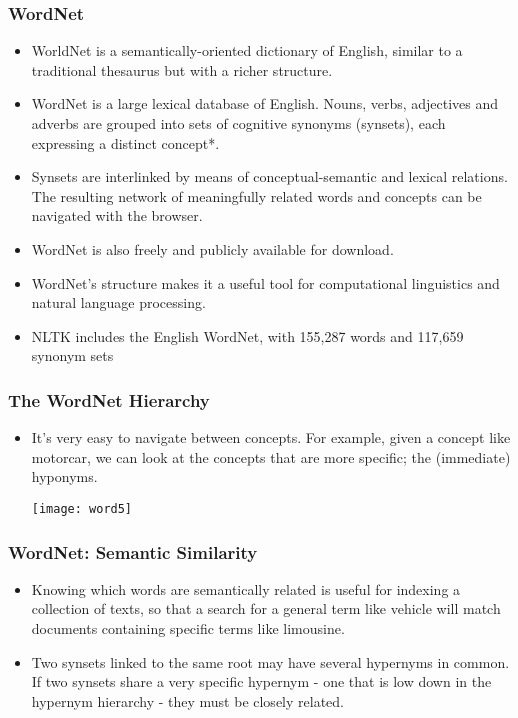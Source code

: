 \begin{frame}[fragile]\frametitle{WordNet}
\begin{itemize}
\item WorldNet is a semantically-oriented dictionary of English, similar to a traditional thesaurus but with a richer structure.
\item WordNet is a large lexical database of English. Nouns, verbs, adjectives and adverbs are grouped into sets of cognitive synonyms (synsets), each expressing a distinct concept*. 
\item Synsets are interlinked by means of conceptual-semantic and lexical relations. The resulting network of meaningfully related words and concepts can be navigated with the browser. 
\item WordNet is also freely and publicly available for download. 
\item WordNet's structure makes it a useful tool for computational linguistics and natural language processing. 
\item NLTK includes the English WordNet, with 155,287 words and 117,659 synonym sets
\end{itemize}
\end{frame}


\begin{frame}[fragile]
\frametitle{The WordNet Hierarchy}
\begin{itemize}
\item It's very easy to navigate between concepts. For example, given a concept like motorcar, we can look at the concepts that are more specific; the (immediate) hyponyms.

\begin{center}
\texttt{[image: word5]}
\end{center}
\end{itemize}
\end{frame}

\begin{frame}[fragile]
\frametitle{WordNet: Semantic Similarity}
\begin{itemize}
\item Knowing which words are semantically related is useful for indexing a collection of texts, so that a search for a general term like vehicle will match documents containing specific terms like limousine.
\item Two synsets linked to the same root may have several hypernyms in common. If two synsets share a very specific hypernym - one that is low down in the hypernym hierarchy - they must be closely related.
\end{itemize}
\end{frame}

